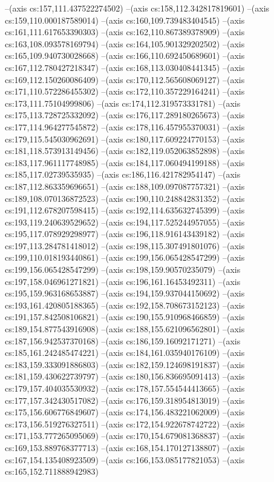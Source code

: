 --(axis cs:157,111.437522274502)
--(axis cs:158,112.342817819601)
--(axis cs:159,110.000187589014)
--(axis cs:160,109.739483404545)
--(axis cs:161,111.617653390303)
--(axis cs:162,110.867389378909)
--(axis cs:163,108.093578169794)
--(axis cs:164,105.901329202502)
--(axis cs:165,109.940730028668)
--(axis cs:166,110.692450689601)
--(axis cs:167,112.780427218347)
--(axis cs:168,113.030408441345)
--(axis cs:169,112.150260086409)
--(axis cs:170,112.565608069127)
--(axis cs:171,110.572286455302)
--(axis cs:172,110.357229164241)
--(axis cs:173,111.75104999806)
--(axis cs:174,112.319573331781)
--(axis cs:175,113.728725332092)
--(axis cs:176,117.289180265673)
--(axis cs:177,114.964277545872)
--(axis cs:178,116.457955370031)
--(axis cs:179,115.545030962691)
--(axis cs:180,117.609224770153)
--(axis cs:181,118.573913149456)
--(axis cs:182,119.052063852898)
--(axis cs:183,117.961117748985)
--(axis cs:184,117.060494199188)
--(axis cs:185,117.02739535935)
--(axis cs:186,116.421782954147)
--(axis cs:187,112.863359696651)
--(axis cs:188,109.097087757321)
--(axis cs:189,108.070136872523)
--(axis cs:190,110.248842831352)
--(axis cs:191,112.678207598415)
--(axis cs:192,114.635632745399)
--(axis cs:193,119.240639529652)
--(axis cs:194,117.525244957055)
--(axis cs:195,117.078929298977)
--(axis cs:196,118.916143439182)
--(axis cs:197,113.284781418012)
--(axis cs:198,115.307491801076)
--(axis cs:199,110.018193440861)
--(axis cs:199,156.065428547299)
--(axis cs:199,156.065428547299)
--(axis cs:198,159.90570235079)
--(axis cs:197,158.046961271821)
--(axis cs:196,161.16453492311)
--(axis cs:195,159.963168653887)
--(axis cs:194,159.937044150692)
--(axis cs:193,161.420805188365)
--(axis cs:192,158.708673152123)
--(axis cs:191,157.842508106821)
--(axis cs:190,155.910968466859)
--(axis cs:189,154.877543916908)
--(axis cs:188,155.621096562801)
--(axis cs:187,156.942537370168)
--(axis cs:186,159.16092171271)
--(axis cs:185,161.242485474221)
--(axis cs:184,161.035940176109)
--(axis cs:183,159.333091886803)
--(axis cs:182,159.124698191837)
--(axis cs:181,159.430622739797)
--(axis cs:180,156.836695091413)
--(axis cs:179,157.404035530932)
--(axis cs:178,157.554544413665)
--(axis cs:177,157.342430517082)
--(axis cs:176,159.318954813019)
--(axis cs:175,156.606776849607)
--(axis cs:174,156.483221062009)
--(axis cs:173,156.519276327511)
--(axis cs:172,154.922678742722)
--(axis cs:171,153.777265095069)
--(axis cs:170,154.679081368837)
--(axis cs:169,153.889768377713)
--(axis cs:168,154.170127138807)
--(axis cs:167,154.135408923509)
--(axis cs:166,153.085177821053)
--(axis cs:165,152.711888942983)
